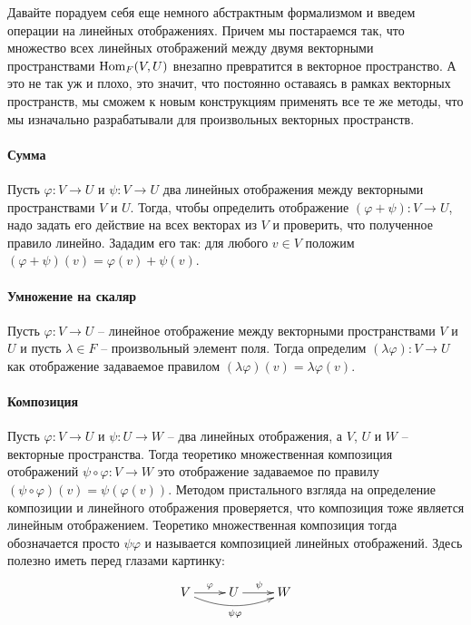 Давайте порадуем себя еще немного абстрактным формализмом и введем операции на линейных отображениях.
Причем мы постараемся так, что множество всех линейных отображений между двумя векторными пространствами $\operatorname{Hom}_F(V,U)$ внезапно превратится в векторное пространство.
А это не так уж и плохо, это значит, что постоянно оставаясь в рамках векторных пространств, мы сможем к новым конструкциям применять все те же методы, что мы изначально разрабатывали для произвольных векторных пространств.

\paragraph{Сумма}

Пусть $\varphi\colon V\to U$ и $\psi \colon V\to U$ два линейных отображения между векторными пространствами $V$ и $U$.
Тогда, чтобы определить отображение $(\varphi+\psi)\colon V\to U$, надо задать его действие на всех векторах из $V$ и проверить, что полученное правило линейно.
Зададим его так: для любого $v\in V$ положим $(\varphi + \psi)(v) = \varphi(v) + \psi(v)$.

\paragraph{Умножение на скаляр}

Пусть $\varphi\colon V\to U$ -- линейное отображение между векторными пространствами $V$ и $U$ и пусть $\lambda \in F$ -- произвольный элемент поля.
Тогда определим $(\lambda \varphi)\colon V\to U$ как отображение задаваемое правилом $(\lambda\varphi)(v) = \lambda \varphi(v)$.

\paragraph{Композиция}

Пусть $\varphi\colon V\to U$ и $\psi \colon U \to W$ -- два линейных отображения, а $V$, $U$ и $W$ -- векторные пространства.
Тогда теоретико множественная композиция отображений $\psi\circ \varphi\colon V\to W$ это отображение задаваемое по правилу $(\psi\circ \varphi)(v) = \psi(\varphi(v))$.
Методом пристального взгляда на определение композиции и линейного отображения проверяется, что композиция тоже является линейным отображением.
Теоретико множественная композиция тогда обозначается просто $\psi\varphi$ и называется композицией линейных отображений.
Здесь полезно иметь перед глазами картинку:
\[
\xymatrix{
  {V}\ar[r]^{\varphi}\ar@/_10pt/[rr]_{\psi\varphi}&{U}\ar[r]^{\psi}&{W}
}
\]

